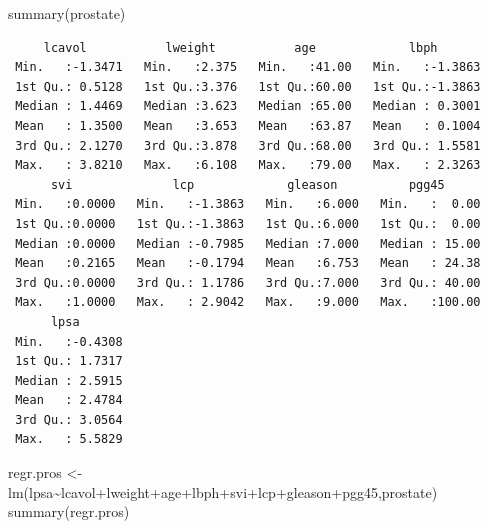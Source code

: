 \documentclass[
  letterpaper,
  DIV=11,
  numbers=noendperiod]{scrartcl}
\newenvironment{Shaded}{\begin{snugshade}}{\end{snugshade}}
\newcommand{\FunctionTok}[1]{\textcolor[rgb]{0.28,0.35,0.67}{#1}}
\newcommand{\NormalTok}[1]{\textcolor[rgb]{0.00,0.23,0.31}{#1}}
\newcommand{\OtherTok}[1]{\textcolor[rgb]{0.00,0.23,0.31}{#1}}
\newcommand{\SpecialCharTok}[1]{\textcolor[rgb]{0.37,0.37,0.37}{#1}}
\begin{document}
\begin{Shaded}
\begin{Highlighting}[]
\FunctionTok{summary}\NormalTok{(prostate)}
\end{Highlighting}
\end{Shaded}

\begin{verbatim}
     lcavol           lweight           age             lbph        
 Min.   :-1.3471   Min.   :2.375   Min.   :41.00   Min.   :-1.3863  
 1st Qu.: 0.5128   1st Qu.:3.376   1st Qu.:60.00   1st Qu.:-1.3863  
 Median : 1.4469   Median :3.623   Median :65.00   Median : 0.3001  
 Mean   : 1.3500   Mean   :3.653   Mean   :63.87   Mean   : 0.1004  
 3rd Qu.: 2.1270   3rd Qu.:3.878   3rd Qu.:68.00   3rd Qu.: 1.5581  
 Max.   : 3.8210   Max.   :6.108   Max.   :79.00   Max.   : 2.3263  
      svi              lcp             gleason          pgg45       
 Min.   :0.0000   Min.   :-1.3863   Min.   :6.000   Min.   :  0.00  
 1st Qu.:0.0000   1st Qu.:-1.3863   1st Qu.:6.000   1st Qu.:  0.00  
 Median :0.0000   Median :-0.7985   Median :7.000   Median : 15.00  
 Mean   :0.2165   Mean   :-0.1794   Mean   :6.753   Mean   : 24.38  
 3rd Qu.:0.0000   3rd Qu.: 1.1786   3rd Qu.:7.000   3rd Qu.: 40.00  
 Max.   :1.0000   Max.   : 2.9042   Max.   :9.000   Max.   :100.00  
      lpsa        
 Min.   :-0.4308  
 1st Qu.: 1.7317  
 Median : 2.5915  
 Mean   : 2.4784  
 3rd Qu.: 3.0564  
 Max.   : 5.5829  
\end{verbatim}

\begin{Shaded}
\begin{Highlighting}[]
\NormalTok{regr.pros }\OtherTok{\textless{}{-}} \FunctionTok{lm}\NormalTok{(lpsa}\SpecialCharTok{\textasciitilde{}}\NormalTok{lcavol}\SpecialCharTok{+}\NormalTok{lweight}\SpecialCharTok{+}\NormalTok{age}\SpecialCharTok{+}\NormalTok{lbph}\SpecialCharTok{+}\NormalTok{svi}\SpecialCharTok{+}\NormalTok{lcp}\SpecialCharTok{+}\NormalTok{gleason}\SpecialCharTok{+}\NormalTok{pgg45,prostate)}
\FunctionTok{summary}\NormalTok{(regr.pros)}
\end{Highlighting}
\end{Shaded}
\end{document}
